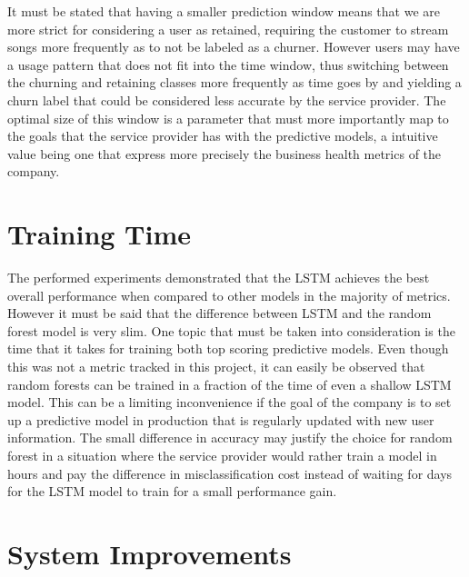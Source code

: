 \documentclass{kththesis}
\begin{document}
It must be stated that having a smaller prediction window means that we are more strict for considering a user as retained, requiring the customer to stream songs more frequently as to not be labeled as a churner. However users may have a usage pattern that does not fit into the time window, thus switching between the churning and retaining classes more frequently as time goes by and yielding a churn label that could be considered less accurate by the service provider. The optimal size of this window is a parameter that must more importantly map to the goals that the service provider has with the predictive models, a intuitive value being one that express more precisely the business health metrics of the company.

\section{Training Time}

The performed experiments demonstrated that the LSTM achieves the best overall performance when compared to other models in the majority of metrics. However it must be said that the difference between LSTM and the random forest model is very slim. One topic that must be taken into consideration is the time that it takes for training both top scoring predictive models. Even though this was not a metric tracked in this project, it can easily be observed that random forests can be trained in a fraction of the time of even a shallow LSTM model. This can be a limiting inconvenience if the goal of the company is to set up a predictive model in production that is regularly updated with new user information. The small difference in accuracy may justify the choice for random forest in a situation where the service provider would rather train a model in hours and pay the difference in misclassification cost instead of waiting for days for the LSTM model to train for a small performance gain. 

\section{System Improvements}
\end{document}
